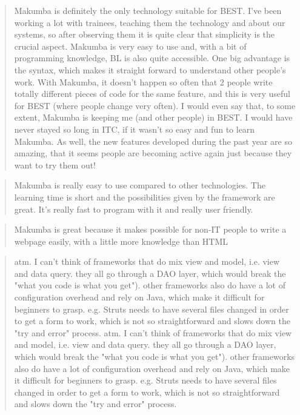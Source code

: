 \documentclass{acm_proc_article-sp}
\begin{document}
\begin{quotation}
	Makumba is definitely the only technology suitable for BEST. I've been working a lot with trainees, teaching them the technology and about our systems, so after observing them it is quite clear that simplicity is the crucial aspect. Makumba is very easy to use and, with a bit of programming knowledge, BL is also quite accessible. One big advantage is the syntax, which makes it straight forward to understand other people's work. With Makumba, it doesn't happen so often that 2 people write totally different pieces of code for the same feature, and this is very useful for BEST (where people change very often). I would even say that, to some extent, Makumba is keeping me (and other people) in BEST. I would have never stayed so long in ITC, if it wasn't so easy and fun to learn Makumba. As well, the new features developed during the past year are so amazing, that it seems people are becoming active again just because they want to try them out! 
\end{quotation}

\begin{quotation}
	Makumba is really easy to use compared to other technologies. The learning time is short and the possibilities given by the framework are great. It's really fast to program with it and really user friendly. 
\end{quotation}

\begin{quotation}
	Makumba is great because it makes possible for non-IT people to write a webpage easily, with a little more knowledge than HTML
\end{quotation}

\begin{quotation}
	atm. I can't think of frameworks that do mix view and model, i.e. view and data query. they all go through a DAO layer, which would break the "what you code is what you get"). other frameworks also do have a lot of configuration overhead and rely on Java, which make it difficult for beginners to grasp. e.g. Struts needs to have several files changed in order to get a form to work, which is not so straightforward and slows down the "try and error" process. atm. I can't think of frameworks that do mix view and model, i.e. view and data query. they all go through a DAO layer, which would break the "what you code is what you get"). other frameworks also do have a lot of configuration overhead and rely on Java, which make it difficult for beginners to grasp. e.g. Struts needs to have several files changed in order to get a form to work, which is not so straightforward and slows down the "try and error" process. 
\end{quotation}
\end{document}
